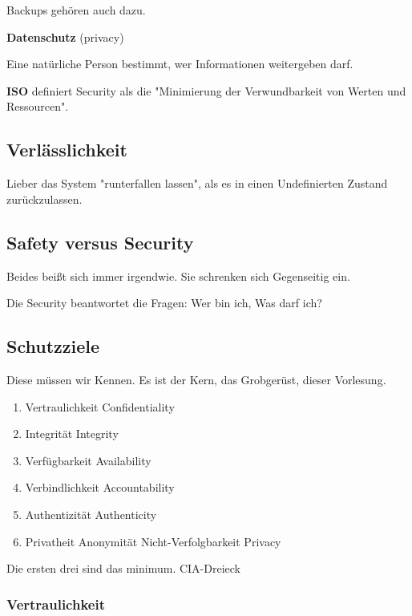 \documentclass[a4paper]{article}
\begin{document}
Backups gehören auch dazu.

\textbf{Datenschutz} (privacy)

Eine natürliche Person bestimmt, wer Informationen weitergeben darf.

\textbf{ISO} definiert Security als die "Minimierung der Verwundbarkeit von Werten und Ressourcen".


\subsection{Verlässlichkeit}

Lieber das System "runterfallen lassen", als es in einen Undefinierten Zustand zurückzulassen.

\subsection{Safety versus Security}

Beides beißt sich immer irgendwie. Sie schrenken sich Gegenseitig ein.

Die Security beantwortet die Fragen: Wer bin ich, Was darf ich?

\subsection{Schutzziele}

Diese müssen wir Kennen. Es ist der Kern, das Grobgerüst, dieser Vorlesung.

\begin{enumerate}
    \item Vertraulichkeit Confidentiality
    \item Integrität Integrity
    \item Verfügbarkeit Availability
    \item Verbindlichkeit Accountability
    \item Authentizität Authenticity
    \item Privatheit Anonymität Nicht-Verfolgbarkeit Privacy
\end{enumerate}

Die ersten drei sind das minimum. CIA-Dreieck

\subsubsection{Vertraulichkeit}
\end{document}
